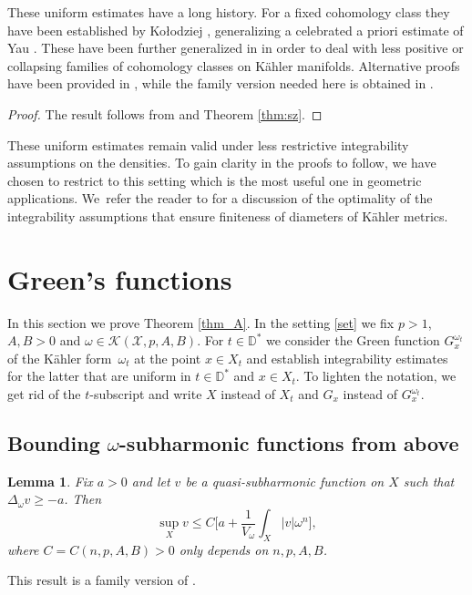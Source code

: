 \documentclass[11pt]{article}
\newcommand{\Subsection}{\subsection}
\numberwithin{equation}{section}
\newtheorem{lem}[theorem]{Lemma}
\theoremstyle{definition}
\begin{document}
These uniform estimates have a long history. For a fixed cohomology class they have been established by Ko{\l}odziej
\cite{Kol98}, generalizing a celebrated a priori estimate of Yau \cite{Yau78}.
These have been further generalized in \cite{EGZ09,EGZ08,DP10,BEGZ10} in order to deal with less positive or collapsing families of cohomology classes on Kähler manifolds. Alternative proofs have been provided in \cite{GL21,GPT23},
while the family version needed here is obtained in \cite{DnGG23}.

\begin{proof}
The result follows from \cite[Th.\,A]{DnGG23} and Theorem \ref{thm:sz}.
\end{proof}

These uniform estimates remain valid under less restrictive integrability assumptions on the densities.
To gain clarity in the proofs to follow, we have chosen to restrict to this setting which is the most useful one
in geometric applications. We~refer the reader to \cite[\S 5]{GGZ23} for a discussion of the optimality of the
integrability assumptions that ensure finiteness of diameters of Kähler metrics.

\section{Green's functions} \label{sec:uniformGreen}

In this section we prove Theorem \ref{thm_A}. In the setting \ref{set} we fix
$p>1$, $A,B>0$ and $\omega \in {\mathcal K}(\mathcal{X},p,A,B)$.
For $t \in {\mathbb D^*}$ we consider the Green function
$G^{\omega_t}_{x}$ of the Kähler form~$\omega_t$ at the point $x \in X_t$ and establish
integrability estimates for the latter that are uniform in $t \in {\mathbb D^*}$ and $x \in X_t$.
To lighten the notation, we get rid of the $t$-subscript and
write $X$ instead of $X_t$ and $G_x$ instead of $G^{\omega_t}_{x}$.

\Subsection{Bounding $\omega$-subharmonic functions from above}

\begin{lem} \label{lem:5.1}
Fix $a>0$ and let $v$ be a quasi-subharmonic function on $X$ such that $\Delta_{\omega} v \geq -a$.
Then\vspace*{-3pt}
\[
\sup_X v \leq C \biggl[ a+ \frac{1}{V_{\omega}} \int_X |v| \omega^n \biggr],
\]
where $C=C(n,p,A,B)>0$ only depends on $n,p,A,B$.
\end{lem}

This result is a family version of \cite[Lem.\,5.1]{GPSS22}.
\end{document}
